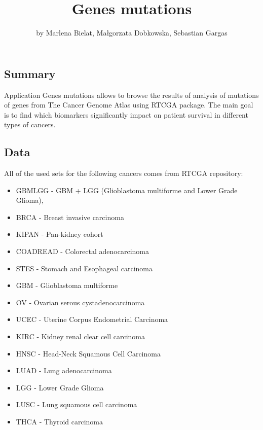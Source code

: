 \title{Genes mutations}
\author{by Marlena Bielat, Małgorzata Dobkowska, Sebastian Gargas}

\maketitle


\subsection{Summary}\label{summary}

Application Genes mutations allows to browse the results of analysis of
mutations of genes from The Cancer Genome Atlas using RTCGA package. The
main goal is to find which biomarkers significantly impact on patient
survival in different types of cancers.

\subsection{Data}\label{data}

All of the used sets for the following cancers comes from RTCGA
repository:

\begin{itemize}
\tightlist
\item
  GBMLGG - GBM + LGG (Glioblastoma multiforme and Lower Grade Glioma),
\item
  BRCA - Breast invasive carcinoma
\item
  KIPAN - Pan-kidney cohort
\item
  COADREAD - Colorectal adenocarcinoma
\item
  STES - Stomach and Esophageal carcinoma
\item
  GBM - Glioblastoma multiforme
\item
  OV - Ovarian serous cystadenocarcinoma
\item
  UCEC - Uterine Corpus Endometrial Carcinoma
\item
  KIRC - Kidney renal clear cell carcinoma
\item
  HNSC - Head-Neck Squamous Cell Carcinoma
\item
  LUAD - Lung adenocarcinoma
\item
  LGG - Lower Grade Glioma
\item
  LUSC - Lung squamous cell carcinoma
\item
  THCA - Thyroid carcinoma
\end{itemize}

